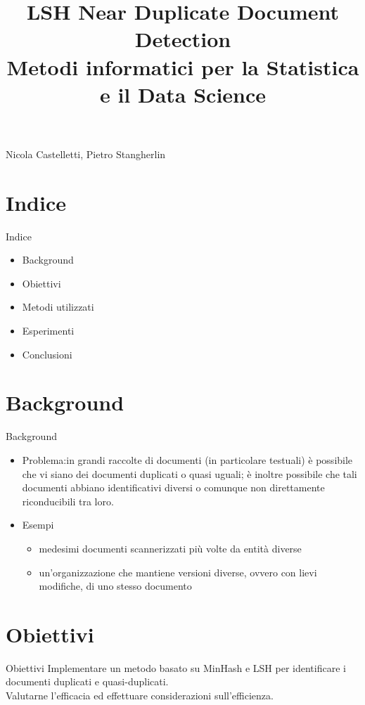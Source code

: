 \documentclass[10pt]{beamer}
\title{%
  \textbf{LSH Near Duplicate Document Detection} \\
  \large Metodi informatici per la Statistica e il Data Science}
\date{}
\begin{document}
\begin{frame}[plain]
    \titlepage
    \vfill
    \begin{center}
        \vspace{0.5cm}
        Nicola Castelletti, Pietro Stangherlin
    \end{center}
\end{frame}



\section{Indice}
\begin{frame}{Indice}
\begin{itemize}
  \item Background
 \item Obiettivi
 \item Metodi utilizzati
 \item Esperimenti
 \item Conclusioni
\end{itemize}
\end{frame}

\section{Background}
\begin{frame}{Background}
\begin{itemize}
 \item Problema:in grandi raccolte di documenti (in particolare testuali) è possibile che vi siano dei documenti duplicati o quasi uguali; è inoltre possibile che tali documenti abbiano identificativi diversi o comunque non direttamente riconducibili tra loro.
 \item Esempi
 \begin{itemize}
 \item medesimi documenti scannerizzati più volte da entità diverse
 \item un’organizzazione che mantiene versioni diverse, ovvero con lievi modifiche, di uno stesso documento
 \end{itemize}
\end{itemize}
\end{frame}

\section{Obiettivi}
\begin{frame}{Obiettivi}
Implementare un metodo basato su MinHash e LSH per identificare i documenti duplicati e quasi-duplicati.\\

Valutarne l’efficacia ed effettuare considerazioni sull’efficienza.
\end{frame}
\end{document}
